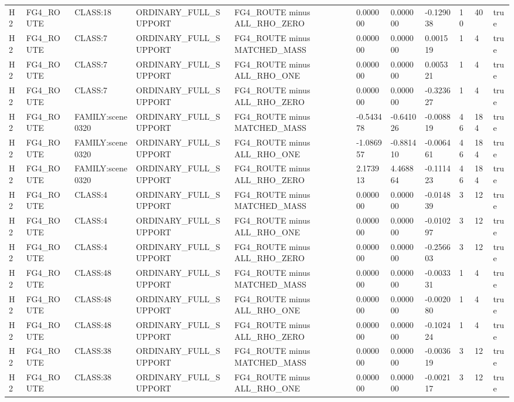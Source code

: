 \begin{tabular}{lllllllllll}
H2 & FG4\_ROUTE & CLASS:18 & ORDINARY\_FULL\_SUPPORT & FG4\_ROUTE minus ALL\_RHO\_ZERO & 0.000000 & 0.000000 & -0.129038 & 10 & 40 & true \\
H2 & FG4\_ROUTE & CLASS:7 & ORDINARY\_FULL\_SUPPORT & FG4\_ROUTE minus MATCHED\_MASS & 0.000000 & 0.000000 & 0.001519 & 1 & 4 & true \\
H2 & FG4\_ROUTE & CLASS:7 & ORDINARY\_FULL\_SUPPORT & FG4\_ROUTE minus ALL\_RHO\_ONE & 0.000000 & 0.000000 & 0.005321 & 1 & 4 & true \\
H2 & FG4\_ROUTE & CLASS:7 & ORDINARY\_FULL\_SUPPORT & FG4\_ROUTE minus ALL\_RHO\_ZERO & 0.000000 & 0.000000 & -0.323627 & 1 & 4 & true \\
H2 & FG4\_ROUTE & FAMILY:scene0320 & ORDINARY\_FULL\_SUPPORT & FG4\_ROUTE minus MATCHED\_MASS & -0.543478 & -0.641026 & -0.008819 & 46 & 184 & true \\
H2 & FG4\_ROUTE & FAMILY:scene0320 & ORDINARY\_FULL\_SUPPORT & FG4\_ROUTE minus ALL\_RHO\_ONE & -1.086957 & -0.881410 & -0.006461 & 46 & 184 & true \\
H2 & FG4\_ROUTE & FAMILY:scene0320 & ORDINARY\_FULL\_SUPPORT & FG4\_ROUTE minus ALL\_RHO\_ZERO & 2.173913 & 4.468864 & -0.111423 & 46 & 184 & true \\
H2 & FG4\_ROUTE & CLASS:4 & ORDINARY\_FULL\_SUPPORT & FG4\_ROUTE minus MATCHED\_MASS & 0.000000 & 0.000000 & -0.014839 & 3 & 12 & true \\
H2 & FG4\_ROUTE & CLASS:4 & ORDINARY\_FULL\_SUPPORT & FG4\_ROUTE minus ALL\_RHO\_ONE & 0.000000 & 0.000000 & -0.010297 & 3 & 12 & true \\
H2 & FG4\_ROUTE & CLASS:4 & ORDINARY\_FULL\_SUPPORT & FG4\_ROUTE minus ALL\_RHO\_ZERO & 0.000000 & 0.000000 & -0.256603 & 3 & 12 & true \\
H2 & FG4\_ROUTE & CLASS:48 & ORDINARY\_FULL\_SUPPORT & FG4\_ROUTE minus MATCHED\_MASS & 0.000000 & 0.000000 & -0.003331 & 1 & 4 & true \\
H2 & FG4\_ROUTE & CLASS:48 & ORDINARY\_FULL\_SUPPORT & FG4\_ROUTE minus ALL\_RHO\_ONE & 0.000000 & 0.000000 & -0.002080 & 1 & 4 & true \\
H2 & FG4\_ROUTE & CLASS:48 & ORDINARY\_FULL\_SUPPORT & FG4\_ROUTE minus ALL\_RHO\_ZERO & 0.000000 & 0.000000 & -0.102424 & 1 & 4 & true \\
H2 & FG4\_ROUTE & CLASS:38 & ORDINARY\_FULL\_SUPPORT & FG4\_ROUTE minus MATCHED\_MASS & 0.000000 & 0.000000 & -0.003619 & 3 & 12 & true \\
H2 & FG4\_ROUTE & CLASS:38 & ORDINARY\_FULL\_SUPPORT & FG4\_ROUTE minus ALL\_RHO\_ONE & 0.000000 & 0.000000 & -0.002117 & 3 & 12 & true \\

\end{tabular}
